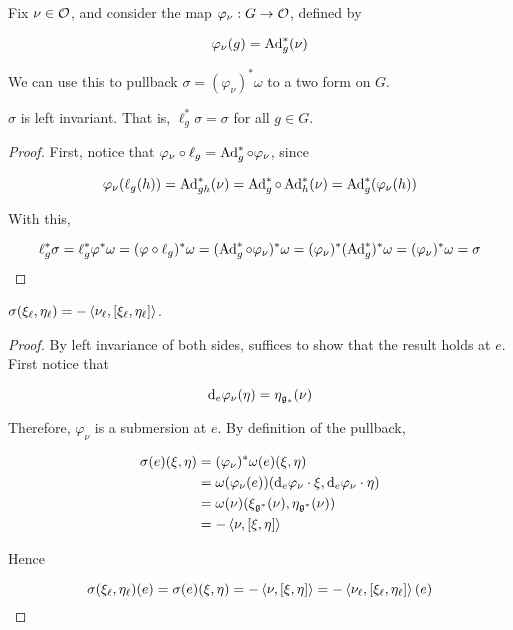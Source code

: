 \documentclass{article}
\begin{document}
Fix \(\nu \in \mathcal{O}\), and consider the map \(\varphi_\nu : G \to \mathcal{O}\), defined by

\[\varphi_\nu(g) = \operatorname{Ad}_g^*(\nu)\]

We can use this to pullback \(\sigma = (\varphi_\nu)^*\omega\) to a two form on \(G\).

\begin{lemma}
    \(\sigma\) is left invariant. That is, \(\ell_g^*\sigma = \sigma\) for all \(g \in G\).
\end{lemma}

\begin{proof}
    First, notice that \(\varphi_\nu \circ \ell_g = \operatorname{Ad}_g^* \circ \varphi_\nu\), since

    \[\varphi_\nu(\ell_g(h)) = \operatorname{Ad}_{gh}^*(\nu) = \operatorname{Ad}_g^*\circ \operatorname{Ad}_h^*(\nu) = \operatorname{Ad}_g^*(\varphi_\nu(h))\]

    With this,

    \[\ell_g^*\sigma = \ell_g^*\varphi^*\omega = (\varphi\circ\ell_g)^*\omega = (\operatorname{Ad}_g^* \circ \varphi_\nu)^*\omega = (\varphi_\nu)^*(\operatorname{Ad}_g^*)^*\omega = (\varphi_\nu)^*\omega = \sigma\]
\end{proof}

\begin{lemma}
    \(\sigma(\xi_\ell, \eta_\ell) = -\left\langle \nu_\ell, [\xi_\ell, \eta_\ell] \right\rangle\).
\end{lemma}

\begin{proof}
    By left invariance of both sides, suffices to show that the result holds at \(e\). First notice that

    \[\dd_e\varphi_\nu(\eta) = \eta_{\mathfrak{g}_*}(\nu)\]

    Therefore, \(\varphi_\nu\) is a submersion at \(e\). By definition of the pullback,

    \begin{align*}
        \sigma(e)(\xi, \eta) &= (\varphi_\nu)^*\omega(e)(\xi, \eta)\\ 
        &= \omega(\varphi_\nu(e))(\dd_e\varphi_\nu \cdot \xi, \dd_e\varphi_\nu\cdot\eta) \\
        &= \omega(\nu)(\xi_{\mathfrak{g}^*}(\nu), \eta_{\mathfrak{g}^*}(\nu)) \\
        &= -\left\langle \nu, [\xi, \eta] \right\rangle
    \end{align*}

    Hence

    \[\sigma(\xi_\ell, \eta_\ell)(e) = \sigma(e)(\xi, \eta) = -\left\langle \nu, [\xi, \eta] \right\rangle = -\left\langle \nu_\ell, [\xi_\ell, \eta_\ell] \right\rangle(e)\]
\end{proof}
\end{document}
